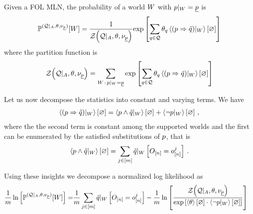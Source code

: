 Given a FOL MLN, the probability of a world $W$ with ${p}|_{W}=\underline{p}$ is %
\begin{align*}
	\mathbb{P}^{(\mathcal{Q} |_{A},\theta , \nu_{\underline{p}})} [W]
	= \frac{1}{\mathcal{Z}{\left(\mathcal{Q} |_{A},\theta , \nu_{\underline{p}}\right)}} 
		\mathrm{exp}\left[\sum_{q\in\mathcal{Q}}\theta_{q}\left\langle {(p\Rightarrow\tilde{q})}|_{W}\right\rangle \left[ \varnothing \right]\right] 
\end{align*}
where the partition function is 
\begin{align*}
	\mathcal{Z}{\left(\mathcal{Q} |_{A},\theta , \nu_{\underline{p}}\right)} = 
	\sum_{W \, : \, {p}|_{W} = \underline{p}}
			\mathrm{exp}\left[\sum_{q\in\mathcal{Q}}\theta_{q}\left\langle {(p\Rightarrow\tilde{q})}|_{W}\right\rangle \left[ \varnothing \right]\right] 
\end{align*}


Let us now decompose the statistics into constant and varying terms.
We have
\begin{align*}
	\left\langle {(p\Rightarrow\tilde{q})}|_{W}\right\rangle \left[ \varnothing \right] = 
		\left\langle {p\land\tilde{q}}|_{W}\right\rangle \left[ \varnothing \right] + \left\langle {\lnot p}|_{W}\right\rangle \left[ \varnothing \right] \, ,
\end{align*}
where the the second term is constant among the supported worlds and the first can be enumerated by the satisfied substitutions of $p$, that is
\begin{align*}
	\left\langle {p\land\tilde{q}}|_{W}\right\rangle \left[ \varnothing \right] 
	= \sum_{j\in[m]}{\tilde{q}}|_{W} \left[O_{[n]} = o_{[n]}^{j}\right] \, .
\end{align*}


Using these insights we decompose a normalized log likelihood as
\begin{align}\label{eq:dataworldLogProb}
	\frac{1}{m} \ln \left[ \mathbb{P}^{(\mathcal{Q} |_{A},\theta , \nu_{\underline{p}})} [W] \right]
	= & \frac{1}{m} \sum_{j\in[m]} {\tilde{q}}|_{W} \left[O_{[n]} = o_{[n]}^{j}\right]
	- \frac{1}{m} \ln \left[ 
		\frac{\mathcal{Z}{\left(\mathcal{Q} |_{A},\theta , \nu_{\underline{p}}\right)}}{
			\mathrm{exp}\left[\left\langle \theta\right\rangle \left[ \varnothing \right] \cdot \left\langle {\lnot p}|_{W}\right\rangle \left[ \varnothing \right]\right]
		}
	 \right]
\end{align} 

